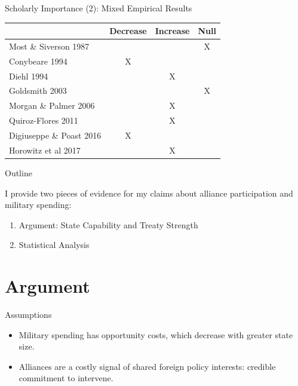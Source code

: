 \documentclass{beamer}
\begin{document}
\begin{frame}{Scholarly Importance (2): Mixed Empirical Results}


\begin{table}[hbt!]
\begin{center}
\begin{tabular}{lccc}
     & Decrease & Increase & Null \\
\hline
Most \& Siverson 1987  &  &  & X \\
Conybeare 1994 & X & &  \\
Diehl 1994 &  & X &  \\
Goldsmith 2003 &  &  & X \\
Morgan \& Palmer 2006 &  & X & \\ 
Quiroz-Flores 2011 &  & X &  \\ 
Digiuseppe \& Poast 2016 & X &  & \\ 
Horowitz et al 2017 &  & X & \\ 
\hline
\end{tabular}
\end{center} 
\end{table}



 \end{frame}


\begin{frame}{Outline}

I provide two pieces of evidence for my claims about alliance participation and military spending: 

\pause
\begin{enumerate}
\item Argument: State Capability and Treaty Strength
\pause
\item Statistical Analysis 
\end{enumerate}


\end{frame}


\section{Argument}


\begin{frame}{Assumptions}

\begin{itemize} 
\item Military spending has opportunity costs, which decrease with greater state size. 
\pause 
\item Alliances are a costly signal of shared foreign policy interests: credible commitment to intervene.  
\end{itemize}


\end{frame}
\end{document}

